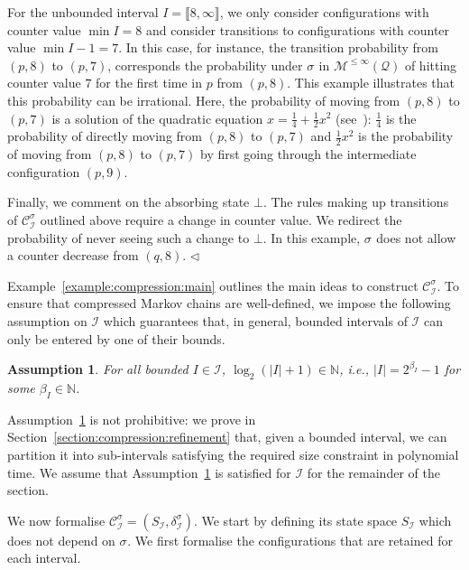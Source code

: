 \documentclass[a4paper,UKenglish,cleveref,autoref,thm-restate,colorlinks]{lipics-v2021}
\newcommand{\integerInterval}[1]{\llbracket{}#1\rrbracket{}}
\newcommand{\IN}{\mathbb{N}}
\newcommand{\mdp}{\mathcal{M}}
\newcommand{\mdpStateSpace}{S}
\newcommand{\mdpTrans}{\delta}
\newcommand{\ocmdp}{\mathcal{Q}}
\newcommand{\ocmdpFin}[2]{\mdp^{\leq #2}(#1)}
\newcommand{\ocState}{q}
\newcommand{\ocStateB}{p}
\newcommand{\mchain}{\mathcal{C}}
\newcommand{\intPart}{\mathcal{I}}
\newcommand{\interval}{I}
\newcommand{\powerMax}{\beta}
\newcommand{\compressChainStrat}[1]{\mchain^{#1}_{\intPart}}
\newcommand{\compressChain}{\compressChainStrat{\strat}}
\newcommand{\compressChainStateSpace}{\mdpStateSpace_{\intPart}}
\newcommand{\compressChainTransTemplate}[2]{\mdpTrans^{#1}_{#2}}
\newcommand{\compressChainTrans}{\compressChainTransTemplate{\strat}{\intPart}}
\newcommand{\varTrans}{x}
\newcommand{\stratGeneric}[1]{{\sigma_{#1}}}
\newcommand{\strat}{\stratGeneric{}}
\newtheorem{assumption}[theorem]{Assumption}
\begin{document}
\begin{example}
  
  For the unbounded interval $\interval = \integerInterval{8, \infty}$, we only consider configurations with counter value $\min\interval=8$ and consider transitions to configurations with counter value $\min\interval-1=7$.
  In this case, for instance, the transition probability from $(\ocStateB, 8)$ to $(\ocStateB, 7)$, corresponds the probability under $\strat$ in $\ocmdpFin{\ocmdp}{\infty}$ of hitting counter value $7$ for the first time in $\ocStateB$ from $(\ocStateB, 8)$.
  This example illustrates that this probability can be irrational.
  Here, the probability of moving from $(\ocStateB, 8)$ to $(\ocStateB, 7)$ is a solution of the quadratic equation $\varTrans = \frac{1}{4}+\frac{1}{2}\varTrans^2$ (see~\cite{DBLP:journals/lmcs/KuceraEM06}): $\frac{1}{4}$ is the probability of directly moving from $(\ocStateB, 8)$ to $(\ocStateB, 7)$ and $\frac{1}{2}\varTrans^2$ is the probability of moving from $(\ocStateB, 8)$ to $(\ocStateB, 7)$ by first going through the intermediate configuration $(\ocStateB, 9)$.

  Finally, we comment on the absorbing state $\bot$.
  The rules making up transitions of $\compressChain$ outlined above require a change in counter value.
  We redirect the probability of never seeing such a change to $\bot$.
  In this example, $\strat$ does not allow a counter decrease from $(\ocState, 8)$.
  \hfill$\lhd$
\end{example}

Example~\ref{example:compression:main} outlines the main ideas to construct $\compressChain$.
To ensure that compressed Markov chains are well-defined, we impose the following assumption on $\intPart$ which guarantees that, in general, bounded intervals of $\intPart$ can only be entered by one of their bounds.
\begin{assumption}\label{assumption:interval size}
  For all bounded $\interval\in\intPart$, $\log_2(|\interval|+1)\in\IN$, i.e., $|\interval| = 2^{\powerMax_{\interval}} - 1$ for some $\powerMax_\interval\in\IN$.
\end{assumption}
Assumption~\ref{assumption:interval size} is not prohibitive: we prove in Section~\ref{section:compression:refinement} that, given a bounded interval, we can partition it into sub-intervals satisfying the required size constraint in polynomial time.
We assume that Assumption~\ref{assumption:interval size} is satisfied for $\intPart$ for the remainder of the section.

We now formalise $\compressChain = (\compressChainStateSpace, \compressChainTrans)$.
We start by defining its state space $\compressChainStateSpace$ which does not depend on $\strat$.
We first formalise the configurations that are retained for each interval.
\end{document}
